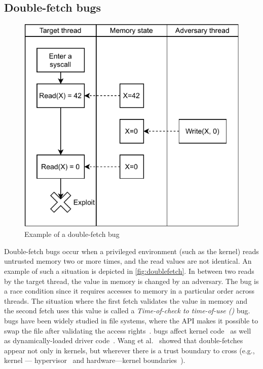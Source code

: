 \documentclass[letterpaper,twocolumn,10pt, anonymous]{article}
\begin{document}
\subsection{Double-fetch bugs}
\begin{figure}[]
  \centering
  \includegraphics[width=.8\linewidth]{img/doublefetch.pdf}
  \caption{Example of a double-fetch bug}
  \label{fig:doublefetch}
\end{figure}

Double-fetch bugs occur when a privileged environment (such as the kernel)
reads untrusted memory two or more times, and the read values are not 
identical. 
An example of such a situation is depicted in \autoref{fig:doublefetch}.
In between two reads by the target thread, the value in memory is changed
by an adversary.
The bug is a race condition since it requires accesses to memory in 
a particular order across threads.
The situation where the first fetch validates the value in memory and 
the second fetch uses this value is called a 
\emph{Time-of-check to time-of-use (\tocttou)} bug.
\tocttou bugs have been widely studied in file systems, where the 
API makes it possible to swap the file after validating the access 
rights~\cite{payer2012protecting,
pu2006methodical, wei2010modeling, tsafrir2008portably}.
\tocttou bugs affect kernel code~\cite{jurczyk2013bochspwn, wang2018survey}
as well as dynamically-loaded driver code~\cite{cve201812633,cve201812633fix}.
Wang et al.~\cite{wang2018survey} showed that double-fetches appear not only
in kernels, but wherever there is a trust boundary to cross (e.g., kernel ---
hypervisor~\cite{wilhelm2016xenpwn} and hardware---kernel
boundaries~\cite{lu2018untrusted}). 
\end{document}
